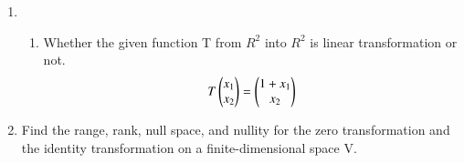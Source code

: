 \renewcommand{\theequation}{\theenumi}
\renewcommand{\thefigure}{\theenumi}
\begin{enumerate}[label=\thesubsection.\arabic*.,ref=\thesubsection.\theenumi]
%
\item 
\begin{enumerate}
\item Whether the given function T from $R^2$ into $R^2$ is linear transformation or not.
\begin{align}
    T\begin{pmatrix}x_1\\x_2\end{pmatrix}=\begin{pmatrix}1+x_1\\x_2\end{pmatrix}
\label{eq:solutions/3/1/1/a/1}
\end{align}
\solution


\end{enumerate}
%
\item Find the range, rank, null space, and nullity for the zero transformation and the identity transformation on a finite-dimensional space V. 
%
\solution



\end{enumerate}
